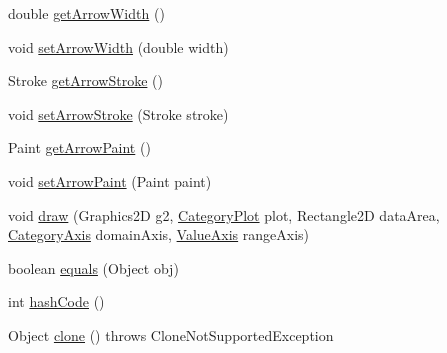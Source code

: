 \begin{DoxyCompactItemize}
\item 
double \mbox{\hyperlink{classorg_1_1jfree_1_1chart_1_1annotations_1_1_category_pointer_annotation_a40de1109ca2d33db27e40be5a874f951}{get\+Arrow\+Width}} ()
\item 
void \mbox{\hyperlink{classorg_1_1jfree_1_1chart_1_1annotations_1_1_category_pointer_annotation_a8f025db11131888280f64eaf79315dbe}{set\+Arrow\+Width}} (double width)
\item 
Stroke \mbox{\hyperlink{classorg_1_1jfree_1_1chart_1_1annotations_1_1_category_pointer_annotation_aee9f2db0519b9f8b02ec0d9c1f9abebf}{get\+Arrow\+Stroke}} ()
\item 
void \mbox{\hyperlink{classorg_1_1jfree_1_1chart_1_1annotations_1_1_category_pointer_annotation_a0cf30cc0bd8a1bc3cb086a1a03f4db70}{set\+Arrow\+Stroke}} (Stroke stroke)
\item 
Paint \mbox{\hyperlink{classorg_1_1jfree_1_1chart_1_1annotations_1_1_category_pointer_annotation_adb30b0bd8b349a9f501baddb97a02c03}{get\+Arrow\+Paint}} ()
\item 
void \mbox{\hyperlink{classorg_1_1jfree_1_1chart_1_1annotations_1_1_category_pointer_annotation_ab9c3c0cd2a1057181ae49aa8acb650ed}{set\+Arrow\+Paint}} (Paint paint)
\item 
void \mbox{\hyperlink{classorg_1_1jfree_1_1chart_1_1annotations_1_1_category_pointer_annotation_a601e21ffb2b2ee40f8ba7f0a6bd97626}{draw}} (Graphics2D g2, \mbox{\hyperlink{classorg_1_1jfree_1_1chart_1_1plot_1_1_category_plot}{Category\+Plot}} plot, Rectangle2D data\+Area, \mbox{\hyperlink{classorg_1_1jfree_1_1chart_1_1axis_1_1_category_axis}{Category\+Axis}} domain\+Axis, \mbox{\hyperlink{classorg_1_1jfree_1_1chart_1_1axis_1_1_value_axis}{Value\+Axis}} range\+Axis)
\item 
boolean \mbox{\hyperlink{classorg_1_1jfree_1_1chart_1_1annotations_1_1_category_pointer_annotation_a37627f18a514530c0be93adf69a6b435}{equals}} (Object obj)
\item 
int \mbox{\hyperlink{classorg_1_1jfree_1_1chart_1_1annotations_1_1_category_pointer_annotation_a8e390935554cea337da4102c667a18f3}{hash\+Code}} ()
\item 
Object \mbox{\hyperlink{classorg_1_1jfree_1_1chart_1_1annotations_1_1_category_pointer_annotation_a98a6bfb8b87235568c5b8576ea6296a5}{clone}} ()  throws Clone\+Not\+Supported\+Exception 
\end{DoxyCompactItemize}
